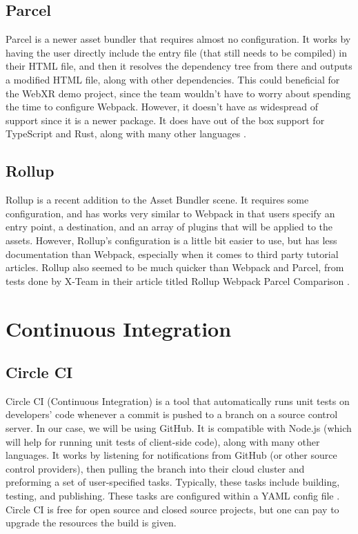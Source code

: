 \documentclass[onecolumn, draftclsnofoot,10pt, compsoc]{IEEEtran}
\begin{document}
\subsection{Parcel}
Parcel is a newer asset bundler that requires almost no configuration. It works by having the user directly include the entry file (that still needs to be compiled) in their HTML file, and then it resolves the dependency tree from there and outputs a modified HTML file, along with other dependencies. This could beneficial for the WebXR demo project, since the team wouldn't have to worry about spending the time to configure Webpack. However, it doesn't have as widespread of support since it is a newer package. It does have out of the box support for TypeScript and Rust, along with many other languages \cite{bundlers}.

\subsection{Rollup}
Rollup is a recent addition to the Asset Bundler scene. It requires some configuration, and has works very similar to Webpack in that users specify an entry point, a destination, and an array of plugins that will be applied to the assets. However, Rollup's configuration is a little bit easier to use, but has less documentation than Webpack, especially when it comes to third party tutorial articles. Rollup also seemed to be much quicker than Webpack and Parcel, from tests done by X-Team in their article titled Rollup Webpack Parcel Comparison \cite{bundlers}.

\section{Continuous Integration}
\subsection{Circle CI}
Circle CI (Continuous Integration) is a tool that automatically runs unit tests on developers' code whenever a commit is pushed to a branch on a source control server. In our case, we will be using GitHub. It is compatible with Node.js (which will help for running unit tests of client-side code), along with many other languages. It works by listening for notifications from GitHub (or other source control providers), then pulling the branch into their cloud cluster and preforming a set of user-specified tasks. Typically, these tasks include building, testing, and publishing. These tasks are configured within a YAML config file \cite{ci}. Circle CI is free for open source and closed source projects, but one can pay to upgrade the resources the build is given.
\end{document}

